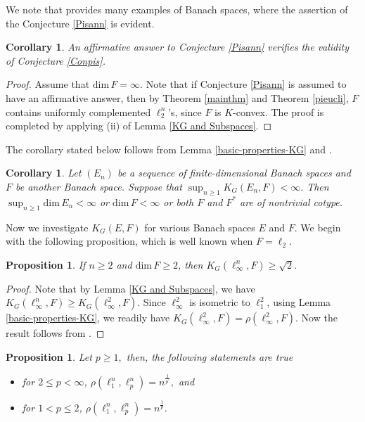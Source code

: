 \documentclass[a4paper,oneside,11pt, reqno]{amsart}
\numberwithin{equation}{section}
\newtheorem{proposition}[theorem]{Proposition}
\newtheorem{corollary}[theorem]{Corollary}
\theoremstyle{plain}
\begin{document}
We note that \cite[Theorem 17.13]{DJT} provides many examples of Banach spaces, where the assertion of the Conjecture \ref{Pisann} is evident.  
\begin{corollary}\label{cor4.6}  An affirmative answer to Conjecture \ref{Pisann} verifies the validity of Conjecture \ref{Conpis}.
\end{corollary}
\begin{proof}
Assume that $\text{dim}\,F=\infty.$ Note that if Conjecture \ref{Pisann} is assumed to have an affirmative answer, then by Theorem \ref{mainthm} and Theorem \ref{pieucli}, $F$ contains uniformly complemented $\ell_2^n$'s, since $F$ is $K$-convex. The proof is completed by applying (ii) of Lemma \ref{KG and Subspaces}.
\end{proof}
The corollary stated below follows from Lemma \ref{basic-properties-KG} and \cite[Proposition 12]{XOR games and GT}.
\begin{corollary}
Let $(E_n)$ be a sequence of finite-dimensional Banach spaces and $F$ be another Banach space. Suppose that $\sup_{n\geqslant 1}K_G(E_n,F)<\infty.$ Then  $\sup_{n\geqslant 1}\text{dim}\,E_n<\infty$ or $\text{dim}\,F<\infty$ or both $F$ and $F^*$ are of nontrivial cotype.
\end{corollary}
Now we investigate $K_G(E,F)$ for various Banach spaces $E$ and $F.$ We begin with the following proposition, which is well known when $F=\ell_2.$
\begin{proposition}
If $n\geqslant 2$ and $\text{dim}\, F\geqslant 2$, then $K_G(\ell_\infty^n,F)\geqslant \sqrt{2}.$
\end{proposition}
\begin{proof}
Note that by Lemma \ref{KG and Subspaces}, we have $K_G(\ell_\infty^n,F)\geqslant K_G(\ell_\infty^2,F).$ Since $\ell_\infty^2$ is isometric to $\ell_1^2$, using Lemma \ref{basic-properties-KG}, we readily have $K_G(\ell_\infty^2,F)=\rho(\ell_\infty^2,F).$ 
Now the result follows from \cite[Proposition 14]{XOR games and GT}.
\end{proof}
\begin{proposition}
Let $p\geqslant 1,$ 
then, the following statements are true
\begin{itemize}
\item[(i)] for $2\leqslant p<\infty$,   $\rho(\ell_1^n,\ell_p^n)=n^{\frac{1}{p^\prime}},$ and 
\item[(ii)] for $1<p\leqslant 2$, $\rho(\ell_1^n,\ell_p^n)=n^{\frac{1}{p}}.$
\end{itemize}
\end{proposition}
\end{document}

